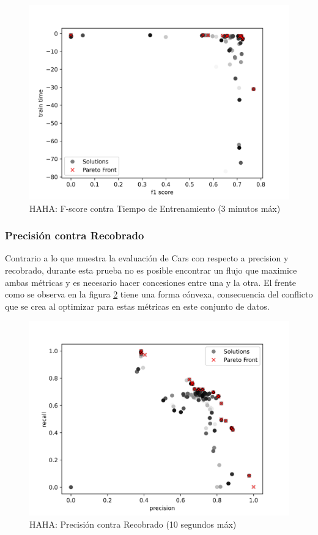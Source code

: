 \begin{figure}[ht]
    \centering
    \includegraphics[scale=0.65]{Pictures/haha_fscore_vs_time_3min.jpg}
    \caption{HAHA: F-score contra Tiempo de Entrenamiento (3 minutos m\'ax)}
    \label{impl:fig:haha:fscore_vs_time_3min}
\end{figure}

\subsubsection{Precisi\'on contra Recobrado}
Contrario a lo que muestra la evaluaci\'on de Cars con respecto a precision y recobrado, durante esta prueba no es posible encontrar un flujo que maximice ambas m\'etricas y es necesario hacer concesiones entre una y la otra. El frente como se observa en la figura \ref{impl:fig:haha:precision_vs_recall} tiene una forma c\'onvexa, consecuencia del conflicto que se crea al optimizar para estas m\'etricas en este conjunto de datos.

\begin{figure}[ht]
    \centering
    \includegraphics[scale=0.65]{Pictures/haha_precision_vs_recall.jpg}
    \caption{HAHA: Precisi\'on contra Recobrado (10 segundos m\'ax)}
    \label{impl:fig:haha:precision_vs_recall}
\end{figure}

